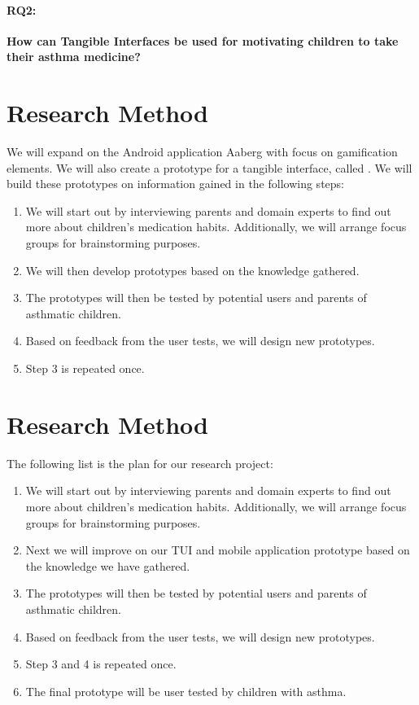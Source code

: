 \paragraph{RQ2:}
\textbf{How can Tangible Interfaces be used for motivating children to take their asthma medicine?}


\section{Research Method}

We will expand on the Android application Aaberg \etal{} with focus on gamification elements. We will also create a prototype for a tangible interface, called \buddy{}. We will build these prototypes on information gained in the following steps:

\begin{enumerate}
  \item We will start out by interviewing parents and domain experts to find out more about children's medication habits. Additionally, we will arrange focus groups for brainstorming purposes.
  \item We will then develop prototypes based on the knowledge gathered.   
  \item The prototypes will then be tested by potential users and parents of asthmatic children. 
  \item Based on feedback from the user tests, we will design new prototypes.
  \item Step 3 is repeated once.
\end{enumerate}
   

\section{Research Method}
\label{sec:researchmethod}

The following list is the plan for our research project:

\begin{enumerate}
  \item We will start out by interviewing parents and domain experts to find out more about children's medication habits. Additionally, we will arrange focus groups for brainstorming purposes.
  \item Next we will improve on our TUI and mobile application prototype based on the knowledge we have gathered.  
  \item The prototypes will then be tested by potential users and parents of asthmatic children. 
  \item Based on feedback from the user tests, we will design new prototypes.
  \item Step 3 and 4 is repeated once.
  \item The final prototype will be user tested by children with asthma.
\end{enumerate}
 
